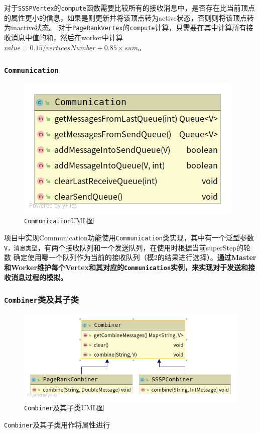 \documentclass{ML}
\begin{document}
对于\texttt{SSSPVertex}的\texttt{compute}函数需要比较所有的接收消息中，是否存在比当前顶点的属性更小的信息，如果是则更新并将该顶点转为active状态，否则则将该顶点转为inactive状态。
对于\texttt{PageRankVertex}的\texttt{compute}计算，只需要在其中计算所有接收消息中值的和，然后在worker中计算$value = 0.15 / verticesNumber + 0.85 \times sum$\cite{pregel}。


\subsubsection{\texttt{Communication}}\label{sec:communication}
\begin{figure}[htb]
    \centering
    \includegraphics[width=0.5\linewidth]{media/Communication.png}
    \caption{\texttt{Communication}UML图}\label{fig:Communication}
\end{figure}

项目中实现Communication功能使用\texttt{Communication}类实现，其中有一个泛型参数\texttt{V，消息类型}，有两个接收队列和一个发送队列，在使用时根据当前superStep的轮数
确定使用哪一个队列作为当前的接收队列（模2的结果进行选择）。\textbf{通过Master和Worker维护每个Vertex和其对应的\texttt{Communication}实例，来实现对于发送和接收消息过程的模拟。}


\subsubsection{\texttt{Combiner}类及其子类}
\begin{figure}[htb]
    \centering
    \includegraphics[width=0.7\linewidth]{media/combiner.png}
    \caption{\texttt{Combiner}及其子类UML图}\label{fig:combiner}
\end{figure}
\texttt{Combiner}及其子类用作将属性进行%
\end{document}
